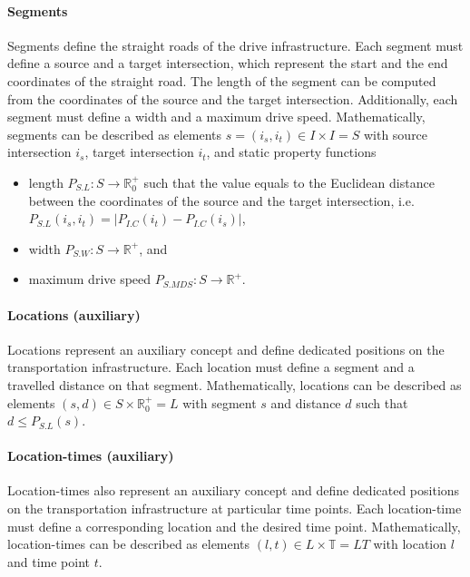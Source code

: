 \documentclass{IEEEtran}
\begin{document}
    \paragraph{Segments}
    Segments define the straight roads of the drive infrastructure.
    Each segment must define a source and a target intersection, which represent the start and the end coordinates of the straight road.
    The length of the segment can be computed from the coordinates of the source and the target intersection.
    Additionally, each segment must define a width and a maximum drive speed.
    Mathematically, segments can be described as elements $s = (i_s, i_t) \in I \times I = S$ with source intersection $i_s$, target intersection $i_t$, and static property functions
    \begin{itemize}
        \item length $P_{S.L}: S \rightarrow \mathbb{R}_0^+$ such that the value equals to the Euclidean distance between the coordinates of the source and the target intersection, i.e.\ $P_{S.L}(i_s, i_t) = |P_{I.C}(i_t) - P_{I.C}(i_s)|$,
        \item width $P_{S.W}: S \rightarrow \mathbb{R}^+$, and
        \item maximum drive speed $P_{S.MDS}: S \rightarrow \mathbb{R}^+$.
    \end{itemize}

    \paragraph{Locations (auxiliary)}
    Locations represent an auxiliary concept and define dedicated positions on the transportation infrastructure.
    Each location must define a segment and a travelled distance on that segment.
    Mathematically, locations can be described as elements $(s, d) \in S \times \mathbb{R}_0^+ = L$ with segment $s$ and distance $d$ such that $d \leq P_{S.L}(s)$.

    \paragraph{Location-times (auxiliary)}
    Location-times also represent an auxiliary concept and define dedicated positions on the transportation infrastructure at particular time points.
    Each location-time must define a corresponding location and the desired time point.
    Mathematically, location-times can be described as elements $(l, t) \in L \times \mathbb{T} = LT$ with location $l$ and time point $t$.
\end{document}
